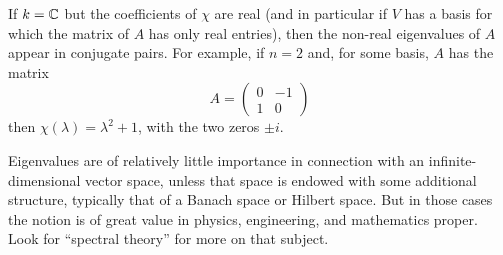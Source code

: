 \documentclass[12pt]{article}
\begin{document}
If $k=\mathbb{C}$ but the coefficients of $\chi$ are real (and in particular if
$V$ has a basis for which the matrix of $A$ has only real entries), then
the non-real eigenvalues of $A$ appear in conjugate pairs. For example,
if $n=2$ and, for some basis, $A$ has the matrix
$$ A = \begin{pmatrix} 0 & -1 \\ 1 & 0 \end{pmatrix} $$
then $\chi(\lambda)=\lambda^2+1$, with the two zeros $\pm i$.

Eigenvalues are of relatively little importance in connection with
an infinite-dimensional vector space, unless that space is endowed with
some additional structure, typically that of a Banach space or Hilbert space. But in those cases the notion is of great value in
physics, engineering, and mathematics proper. Look for ``spectral theory''
for more on that subject.
\end{document}
